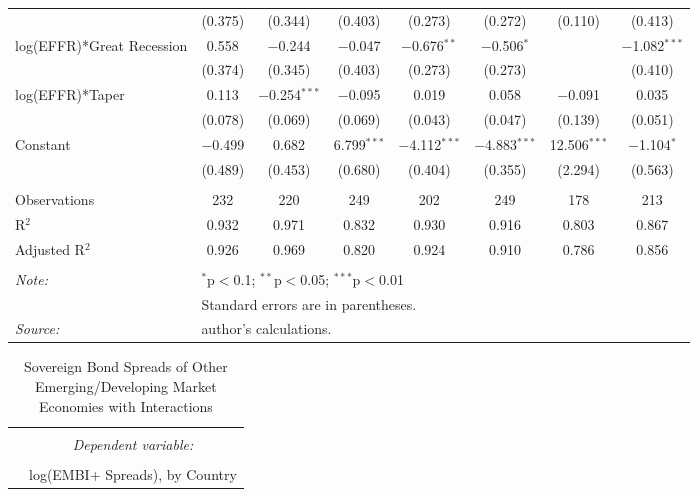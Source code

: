 \documentclass[12pt]{article}
\begin{document}
\begin{landscape}
\begin{table}[!htbp]
\begin{tabular}{@{\extracolsep{5pt}}lccccccc}
  & (0.375) & (0.344) & (0.403) & (0.273) & (0.272) & (0.110) & (0.413) \\ 
  log(EFFR)*Great Recession & 0.558 & $-$0.244 & $-$0.047 & $-$0.676$^{**}$ & $-$0.506$^{*}$ &  & $-$1.082$^{***}$ \\ 
  & (0.374) & (0.345) & (0.403) & (0.273) & (0.273) &  & (0.410) \\ 
  log(EFFR)*Taper & 0.113 & $-$0.254$^{***}$ & $-$0.095 & 0.019 & 0.058 & $-$0.091 & 0.035 \\ 
  & (0.078) & (0.069) & (0.069) & (0.043) & (0.047) & (0.139) & (0.051) \\ 
  Constant & $-$0.499 & 0.682 & 6.799$^{***}$ & $-$4.112$^{***}$ & $-$4.883$^{***}$ & 12.506$^{***}$ & $-$1.104$^{*}$ \\ 
  & (0.489) & (0.453) & (0.680) & (0.404) & (0.355) & (2.294) & (0.563) \\ 
 \hline \\[-1.8ex] 
Observations & 232 & 220 & 249 & 202 & 249 & 178 & 213 \\ 
R$^{2}$ & 0.932 & 0.971 & 0.832 & 0.930 & 0.916 & 0.803 & 0.867 \\ 
Adjusted R$^{2}$ & 0.926 & 0.969 & 0.820 & 0.924 & 0.910 & 0.786 & 0.856 \\ 
\hline 
\hline \\[-1.8ex] 
\textit{Note:}  & \multicolumn{7}{l}{$^{*}$p$<$0.1; $^{**}$p$<$0.05; $^{***}$p$<$0.01} \\ 
 & \multicolumn{7}{l}{Standard errors are in parentheses.} \\
 \textit{Source:}  & \multicolumn{7}{l}{author's calculations.} \\  
\end{tabular} 
\end{table} 
\newpage
\begin{table}[!htbp] \centering 
  \caption{Sovereign Bond Spreads of Other Emerging/Developing Market Economies with Interactions} 
  \label{tbl5} 
\scriptsize 
\begin{tabular}{@{\extracolsep{5pt}}lccccccccc} 
\\[-1.8ex]\hline 
\hline \\[-1.8ex] 
 & \multicolumn{9}{c}{\textit{Dependent variable:}} \\ 
\cline{2-10} 
\\[-1.8ex] & \multicolumn{9}{c}{log(EMBI+ Spreads), by Country} \\ 

\end{tabular}
\end{table}
\end{landscape}
\end{document}
